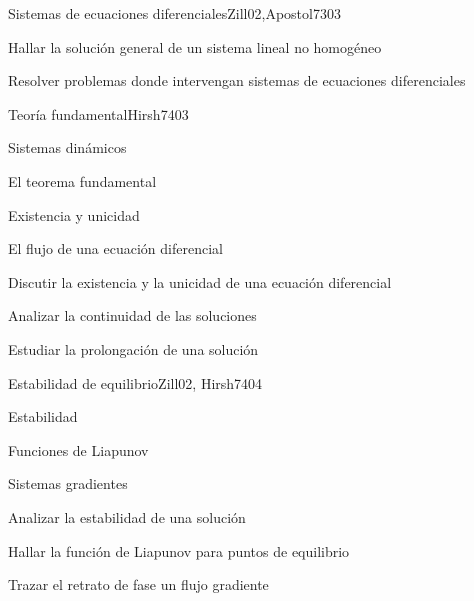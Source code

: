 \begin{syllabus}
\begin{unit}{Sistemas de ecuaciones diferenciales}{Zill02,Apostol73}{0}{3}
   \begin{learningoutcomes}
      \item Hallar la solución general de un sistema lineal no  homogéneo
      \item Resolver problemas donde intervengan sistemas de ecuaciones diferenciales
   \end{learningoutcomes}
\end{unit}

\begin{unit}{Teoría fundamental}{Hirsh74}{0}{3}
\begin{topics}
      \item Sistemas dinámicos
      \item El teorema fundamental
      \item Existencia y unicidad
      \item El flujo de una ecuación diferencial
   \end{topics}

   \begin{learningoutcomes}
      \item Discutir la existencia y la unicidad de una ecuación diferencial
      \item Analizar la continuidad de las soluciones
      \item Estudiar la prolongación de una solución

   \end{learningoutcomes}
\end{unit}

\begin{unit}{Estabilidad de equilibrio}{Zill02, Hirsh74}{0}{4}
\begin{topics}
      \item Estabilidad
      \item Funciones de Liapunov
      \item Sistemas gradientes
   \end{topics}

   \begin{learningoutcomes}
      \item Analizar la estabilidad de una solución
      \item Hallar la función de Liapunov para puntos de  equilibrio
      \item Trazar el retrato de fase un flujo gradiente
    \end{learningoutcomes}
\end{unit}



\begin{coursebibliography}
\end{coursebibliography}

\end{syllabus}
